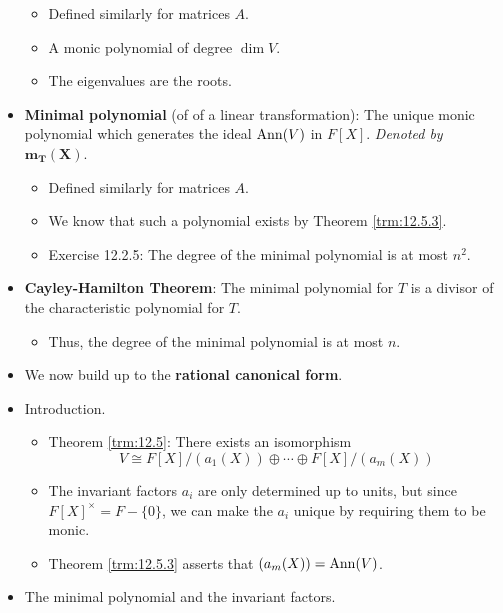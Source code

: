 \documentclass[../notes.tex]{subfiles}
\begin{document}
\begin{itemize}
    \begin{itemize}
        \item Defined similarly for matrices $A$.
        \item A monic polynomial of degree $\dim V$.
        \item The eigenvalues are the roots.
    \end{itemize}
    \item \textbf{Minimal polynomial} (of of a linear transformation): The unique monic polynomial which generates the ideal $\operatorname{Ann}(V)$ in $F[X]$. \emph{Denoted by} $\bm{m_T(X)}$.
    \begin{itemize}
        \item Defined similarly for matrices $A$.
        \item We know that such a polynomial exists by Theorem \ref{trm:12.5.3}.
        \item Exercise 12.2.5: The degree of the minimal polynomial is at most $n^2$.
    \end{itemize}
    \item \textbf{Cayley-Hamilton Theorem}: The minimal polynomial for $T$ is a divisor of the characteristic polynomial for $T$.
    \begin{itemize}
        \item Thus, the degree of the minimal polynomial is at most $n$.
    \end{itemize}
    \item We now build up to the \textbf{rational canonical form}.
    \item Introduction.
    \begin{itemize}
        \item Theorem \ref{trm:12.5}: There exists an isomorphism
        \begin{equation}\label{eqn:12.1}
            V \cong F[X]/(a_1(X))\oplus\cdots\oplus F[X]/(a_m(X))
        \end{equation}
        \item The invariant factors $a_i$ are only determined up to units, but since $F[X]^\times=F-\{0\}$, we can make the $a_i$ unique by requiring them to be monic.
        \item Theorem \ref{trm:12.5.3} asserts that $(a_m(X))=\operatorname{Ann}(V)$.
    \end{itemize}
    \item The minimal polynomial and the invariant factors.

\end{itemize}
\end{document}

